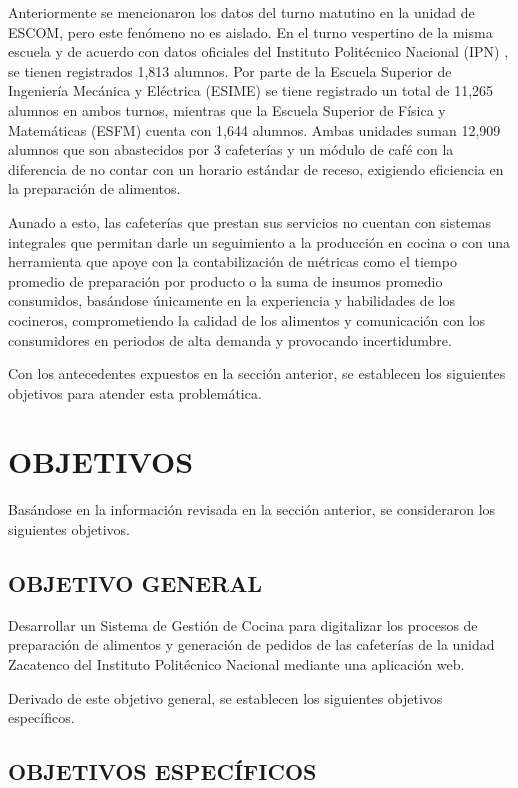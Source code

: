 Anteriormente se mencionaron los datos del turno matutino en la unidad de ESCOM, pero este fenómeno no es aislado. En el turno vespertino de la misma escuela y de acuerdo con datos oficiales del Instituto Politécnico Nacional (IPN) \cite{ipn2025estadistica}, se tienen registrados 1,813 alumnos. Por parte de la Escuela Superior de Ingeniería Mecánica y Eléctrica (ESIME) se tiene registrado un total de 11,265 alumnos en ambos turnos, mientras que la Escuela Superior de Física y Matemáticas (ESFM) cuenta con 1,644 alumnos. Ambas unidades suman 12,909 alumnos que son abastecidos por 3 cafeterías y un módulo de café \cite{ipn2026convocatorias} con la diferencia de no contar con un horario estándar de receso, exigiendo eficiencia en la preparación de alimentos. 

Aunado a esto, las cafeterías que prestan sus servicios no cuentan con sistemas integrales que permitan darle un seguimiento a la producción en cocina o con una herramienta que apoye con la contabilización de métricas como el tiempo promedio de preparación por producto o la suma de insumos promedio consumidos, basándose únicamente en la experiencia y habilidades de los cocineros, comprometiendo la calidad de los alimentos y comunicación con los consumidores en periodos de alta demanda y provocando incertidumbre.  

Con los antecedentes expuestos en la sección anterior, se establecen los siguientes objetivos para atender esta problemática.

\section{OBJETIVOS}
Basándose en la información revisada en la sección anterior, se consideraron los siguientes objetivos.

\subsection{OBJETIVO GENERAL}
Desarrollar un Sistema de Gestión de Cocina para digitalizar los procesos de preparación de alimentos y generación de pedidos de las cafeterías de la unidad Zacatenco del Instituto Politécnico Nacional mediante una aplicación web.  

Derivado de este objetivo general, se establecen los siguientes objetivos específicos. 

\subsection{OBJETIVOS ESPECÍFICOS}

